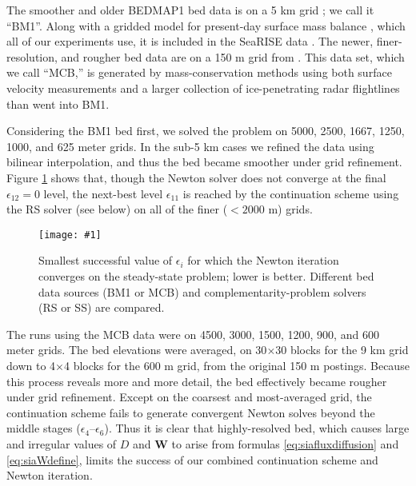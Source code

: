 \documentclass[review,letterpaper]{igs}
\newcommand{\onecol}[1]{\texttt{[image: \#1]}}
\newcommand\bW{\mathbf{W}}
\newcommand\eps{\epsilon}
\begin{document}
\newcommand{\BM}{\textsf{BM1}\xspace}
\newcommand{\MCB}{\textsf{MCB}\xspace}
\newcommand{\virs}{\textsf{RS}\xspace}
\newcommand{\viss}{\textsf{SS}\xspace}

The smoother and older BEDMAP1 bed data is on a 5 km grid \citep{Bamberetal2001}; we call it ``\BM''.  Along with a gridded model for present-day surface mass balance \citep{Ettemaetal2009}, which all of our experiments use, it is included in the SeaRISE data \citep{Bindschadleretal2013}.  The newer, finer-resolution, and rougher bed data are on a 150 m grid from \cite{Morlighemetal2014}.  This data set, which we call ``\MCB,'' is generated by mass-conservation methods using both surface velocity measurements and a larger collection of ice-penetrating radar flightlines than went into \BM.

Considering the \BM bed first, we solved the problem on 5000, 2500, 1667, 1250, 1000, and 625 meter grids.  In the sub-5 km cases we refined the data using bilinear interpolation, and thus the bed became smoother under grid refinement.  Figure \ref{fig:grnrobusteps} shows that, though the Newton solver does not converge at the final $\eps_{12}=0$ level, the next-best level $\eps_{11}$ is reached by the continuation scheme using the \virs solver (see below) on all of the finer ($<2000$ m) grids.

\begin{figure}[ht]
\onecol{grnrobusteps.pdf}
\caption{Smallest successful value of $\eps_i$ for which the Newton iteration converges on the steady-state problem; lower is better.  Different bed data sources (\BM or \MCB) and complementarity-problem solvers (\virs or \viss) are compared.}
\label{fig:grnrobusteps}
\end{figure}

The runs using the \MCB data were on 4500, 3000, 1500, 1200, 900, and 600 meter grids.  The bed elevations were averaged, on 30$\times$30 blocks for the 9 km grid down to 4$\times$4 blocks for the 600 m grid, from the original 150 m postings.  Because this process reveals more and more detail, the bed effectively became rougher under grid refinement.  Except on the coarsest and most-averaged grid, the continuation scheme fails to generate convergent Newton solves beyond the middle stages ($\eps_4$--$\eps_6$).  Thus it is clear that highly-resolved bed, which causes large and irregular values of $D$ and $\bW$ to arise from formulas \eqref{eq:siafluxdiffusion} and \eqref{eq:siaWdefine}, limits the success of our combined continuation scheme and Newton iteration.
\end{document}
